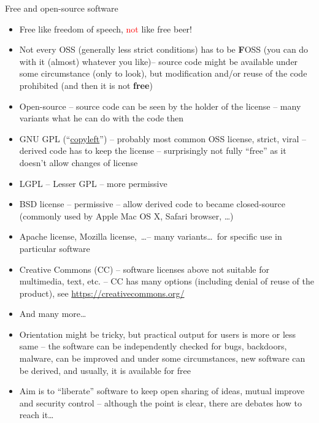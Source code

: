 \documentclass[compress, ucs, xelatex, 11pt, xcolor=svgnames,
  hyperref={
    bookmarks=true,
    unicode=true,
    colorlinks=true,
    pdftitle={Linux, command line and MetaCentrum},
    plainpages=false,
    pdfauthor={Vojtech Zeisek},
    pdfsubject={Course about use of Linux command line, writing shell scripts and using MetaCentrum of CESNET},
    pdfcreator={XeLaTeX},
    pdfkeywords={Linux, GNU, BASH, shell, command line, MetaCentrum},
    linkcolor=Red,
    anchorcolor=Blue,
    citecolor=Purple,
    filecolor=DodgerBlue,
    menucolor=DarkOrchid,
    urlcolor=DeepSkyBlue,
    pdftex},
  url={hyphens, lowtilde} %
  ]{beamer}
\renewcommand{\alert}[1]{\textcolor{red}{#1}}
\begin{document}
\begin{frame}[allowframebreaks]{Free and open-source software}
\begin{itemize}
  \item Free like freedom of speech, \alert{not} like free beer!
  \item Not every OSS (generally less strict conditions) has to be \textbf{F}OSS (you can do with it (almost) whatever you like)-- source code might be available under some circumstance (only to look), but modification and/or reuse of the code prohibited (and then it is not \textbf{free})
  \item Open-source -- source code can be seen by the holder of the license -- many variants what he can do with the code then
  \item GNU GPL (``\href{https://www.gnu.org/copyleft/}{copyleft}'') -- probably most common OSS license, strict, viral -- derived code has to keep the license -- surprisingly not fully ``free'' as it doesn't allow changes of license
  \item LGPL -- Lesser GPL -- more permissive
  \item BSD license -- permissive -- allow derived code to became closed-source (commonly used by Apple Mac OS X, Safari browser, \ldots)
  \item Apache license, Mozilla license,~\ldots -- many variants\ldots~for specific use in particular software
  \item Creative Commons (CC) -- software licenses above not suitable for multimedia, text, etc. -- CC has many options (including denial of reuse of the product), see \url{https://creativecommons.org/}
  \item And many more\ldots
  \item Orientation might be tricky, but practical output for users is more or less same -- the software can be independently checked for bugs, backdoors, malware, can be improved and under some circumstances, new software can be derived, and usually, it is available for free
  \item Aim is to ``liberate'' software to keep open sharing of ideas, mutual improve and security control -- although the point is clear, there are debates how to reach it\ldots
\end{itemize}
\end{frame}
\end{document}
